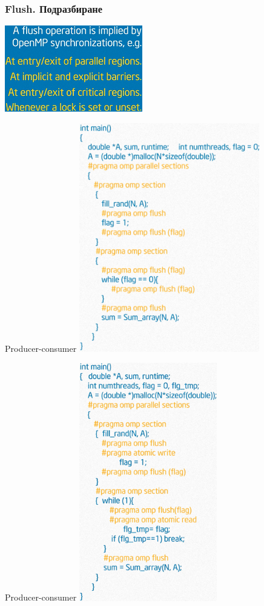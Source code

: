 \documentclass{beamer}
\begin{document}
\begin{frame}
  \frametitle{Flush. Подразбиране}
  \centering
  \includegraphics[width=0.45\textwidth]{flush1}  
\end{frame}

\begin{frame}[plain]{Producer-consumer}
  \centering
  \includegraphics[width=0.59\textwidth]{section-flush}    
\end{frame}

\begin{frame}[plain]{Producer-consumer}
  \centering
  \includegraphics[width=0.45\textwidth]{section-flush1}    
\end{frame}
\end{document}
